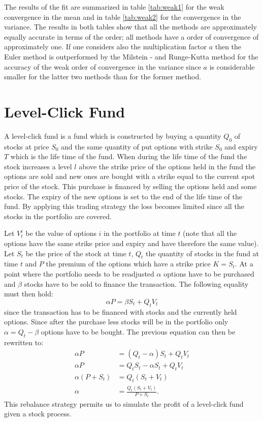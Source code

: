 \documentclass[a4paper,onecolumn]{IEEEtran}
\begin{document}
The results of the fit are summarized in table \ref{tab:weak1} for the weak
convergence in the mean and in table \ref{tab:weak2} for the convergence in
the variance. The results in both tables show that all the methods
are approximately equally accurate in terms of the order; all methods have a
order of convergence of approximately one. If one considers also the
multiplication factor $a$ then the Euler method is outperformed by the
Milstein - and Runge-Kutta method for the accuracy of the weak order of
convergence in the variance since $a$ is considerable smaller for the latter
two methods than for the former method.

\section{Level-Click Fund}
A level-click fund is a fund which is constructed by buying a quantity $Q_0$ of
stocks at price $S_0$ and the same quantity of put options with strike $S_0$
and expiry $T$ which is the life time of the fund. When during the life time
of the fund the stock increases a level $l$ above the strike price of the
options held in the fund the options are sold and new ones are bought with a
strike equal to the current spot price of the stock. This purchase is financed
by selling the options held and some stocks. The expiry of the new options is
set to the end of the life time of the fund. By applying this trading strategy
the loss becomes limited since all the stocks in the portfolio are covered.

Let $V^i_t$ be the value of options $i$ in the portfolio at time $t$ (note
that all the options have the same strike price and expiry and have therefore
the same value). Let $S_t$ be the price of the stock at time $t$, $Q_t$ the
quantity of stocks in the fund at time $t$ and $P$ the premium of the options
which have a strike price $K = S_t$. At a point where the portfolio needs to
be readjusted $\alpha$ options have to be purchased and $\beta$ stocks have to
be sold to finance the transaction. The following equality must then hold:
\begin{equation*}
\alpha P = \beta S_t + Q_t V_t
\end{equation*}
since the transaction has to be financed with stocks and the currently held
options. Since after the purchase less stocks will be in the portfolio only
$\alpha = Q_t - \beta$ options have to be bought. The previous equation can
then be rewritten to:
\begin{equation*}
\begin{split}
\alpha  P &= (Q_t - \alpha) S_t + Q_t V_t\\
\alpha P &= Q_t S_t - \alpha S_t + Q_t V_t\\
\alpha (P + S_t) &= Q_t (S_t + V_t)\\
\alpha &= \frac{Q_t(S_t + V_t)}{P + S_t}.
\end{split}
\end{equation*}
This rebalance strategy permits us to simulate the profit of a level-click
fund given a stock process. 
\end{document}

